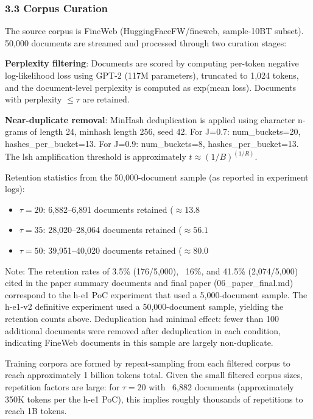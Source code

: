 \subsubsection{3.3 Corpus Curation}

The source corpus is FineWeb (HuggingFaceFW/fineweb, sample-10BT subset). 50,000 documents are streamed and processed through two curation stages:

\textbf{Perplexity filtering}: Documents are scored by computing per-token negative log-likelihood loss using GPT-2 (117M parameters), truncated to 1,024 tokens, and the document-level perplexity is computed as exp(mean loss). Documents with perplexity $\leq \tau$ are retained.

\textbf{Near-duplicate removal}: MinHash deduplication is applied using character n-grams of length 24, minhash length 256, seed 42. For J=0.7: num\_buckets=20, hashes\_per\_bucket=13. For J=0.9: num\_buckets=8, hashes\_per\_bucket=13. The lsh amplification threshold is approximately $t \approx (1/B)^{(1/R)}$.

Retention statistics from the 50,000-document sample (as reported in experiment logs):
\begin{itemize}
\item $\tau =20$: 6,882--6,891 documents retained ($\approx 13.8$%
\item $\tau =35$: 28,020--28,064 documents retained ($\approx 56.1$%
\item $\tau =50$: 39,951--40,020 documents retained ($\approx 80.0$%
\end{itemize}

Note: The retention rates of 3.5\% (176/5,000), ~16\%, and 41.5\% (2,074/5,000) cited in the paper summary documents and final paper (06\_paper\_final.md) correspond to the h-e1 PoC experiment that used a 5,000-document sample. The h-e1-v2 definitive experiment used a 50,000-document sample, yielding the retention counts above. Deduplication had minimal effect: fewer than 100 additional documents were removed after deduplication in each condition, indicating FineWeb documents in this sample are largely non-duplicate.

Training corpora are formed by repeat-sampling from each filtered corpus to reach approximately 1 billion tokens total. Given the small filtered corpus sizes, repetition factors are large: for $\tau =20$ with ~6,882 documents (approximately 350K tokens per the h-e1 PoC), this implies roughly thousands of repetitions to reach 1B tokens.

